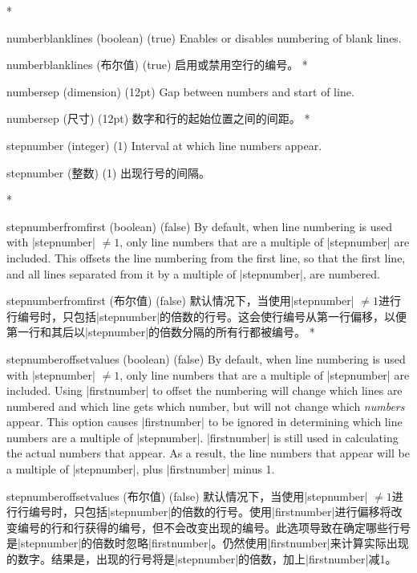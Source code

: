 \begin{optionlist}
\begin{paracol}{2}
\switchcolumn[0]*%
  \item[numberblanklines (boolean) (true)]
    Enables or disables numbering of blank lines.
    \switchcolumn
    \item[numberblanklines (布尔值) (true)]
    启用或禁用空行的编号。
\switchcolumn[0]*%
  \item[numbersep (dimension) (12pt)]
    Gap between numbers and start of line.
    \switchcolumn
    \item[numbersep (尺寸) (12pt)]
    数字和行的起始位置之间的间距。
    \switchcolumn[0]*%
  \item[stepnumber (integer) (1)]
    Interval at which line numbers appear.
    \switchcolumn
    \item[stepnumber (整数) (1)]
    出现行号的间隔。

    \switchcolumn[0]*%

\item[stepnumberfromfirst (boolean) (false)]
By default, when line numbering is used with |stepnumber| $\ne 1$, only line numbers that are a multiple of |stepnumber| are included.  This offsets the line numbering from the first line, so that the first line, and all lines separated from it by a multiple of |stepnumber|, are numbered.

\switchcolumn
\item[stepnumberfromfirst (布尔值) (false)]
 默认情况下，当使用|stepnumber| $\ne 1$进行行编号时，只包括|stepnumber|的倍数的行号。这会使行编号从第一行偏移，以便第一行和其后以|stepnumber|的倍数分隔的所有行都被编号。
\switchcolumn[0]*%
\item[stepnumberoffsetvalues (boolean) (false)]
By default, when line numbering is used with |stepnumber| $\ne 1$, only line numbers that are a multiple of |stepnumber| are included.  Using |firstnumber| to offset the numbering will change which lines are numbered and which line gets which number, but will not change which \emph{numbers} appear.  This option causes |firstnumber| to be ignored in determining which line numbers are a multiple of |stepnumber|.  |firstnumber| is still used in calculating the actual numbers that appear.  As a result, the line numbers that appear will be a multiple of |stepnumber|, plus |firstnumber| minus 1.
\switchcolumn
\item[stepnumberoffsetvalues (布尔值) (false)]
 默认情况下，当使用|stepnumber| $\ne 1$进行行编号时，只包括|stepnumber|的倍数的行号。使用|firstnumber|进行偏移将改变编号的行和行获得的编号，但不会改变出现的编号。此选项导致在确定哪些行号是|stepnumber|的倍数时忽略|firstnumber|。仍然使用|firstnumber|来计算实际出现的数字。结果是，出现的行号将是|stepnumber|的倍数，加上|firstnumber|减1。
\end{paracol}
\end{optionlist}
